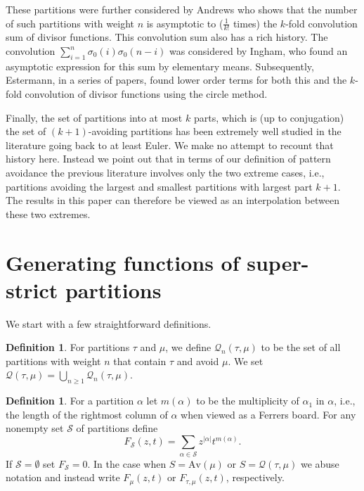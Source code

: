 \documentclass{article}
\theoremstyle{plain}
\theoremstyle{definition}
\newtheorem{definition}[theorem]{Definition}
\newcommand{\Av}{\text{Av}}
\newcommand{\Q}{\mathcal{Q}}
\renewcommand{\S}{\mathcal{S}}
\begin{document}
These partitions were further considered by Andrews \cite{AndrewsSLB} who shows that the number of such partitions with weight $n$ is asymptotic to ($\frac{1}{k!}$ times) the $k$-fold convolution sum of divisor functions.  This convolution sum also has a rich history.  The convolution $\sum_{i=1}^n \sigma_0(i)\sigma_0(n-i)$ was considered by Ingham, who found an asymptotic expression for this sum by elementary means.  Subsequently, Estermann, in a series of papers, found lower order terms for both this and the $k$-fold convolution of divisor functions using the circle method.  

Finally, the set of partitions into at most $k$ parts, which is (up to conjugation) the set of $(k+1)$-avoiding partitions has been extremely well studied in the literature going back to at least Euler. We make no attempt to recount that history here.  Instead we point out that in terms of our definition of pattern avoidance the previous literature involves only the two extreme cases, i.e., partitions avoiding the largest and smallest partitions with largest part $k+1$.  The results in this paper can therefore be viewed as an interpolation between these two extremes.  





\section{Generating functions of super-strict partitions}\label{sec:rational}


We start with a few straightforward definitions. 
\begin{definition}
For partitions $\tau$ and $\mu$, we define $\Q_n(\tau,\mu)$ to be the set of all partitions with weight $n$ that contain $\tau$ and avoid $\mu$. We set $\Q(\tau,\mu) = \bigcup_{n\geq 1} \Q_n(\tau,\mu)$.
\end{definition}


\begin{definition}
For a partition $\alpha$ let $m(\alpha)$ to be the multiplicity of $\alpha_1$ in $\alpha$, i.e., the length of the rightmost column of $\alpha$ when viewed as a Ferrers board. For any nonempty set  $\S$ of partitions define 
$$F_{\S}(z,t) = \sum_{\alpha\in \S} z^{|\alpha|}t^{m(\alpha)}.$$
If $\S=\emptyset$ set $F_\S = 0$.  In the case when $S = \Av(\mu)$ or $S = \Q(\tau,\mu)$ we abuse notation and instead write $F_\mu(z,t)$ or $F_{\tau,\mu}(z,t)$, respectively.  	
\end{definition}
\end{document}
